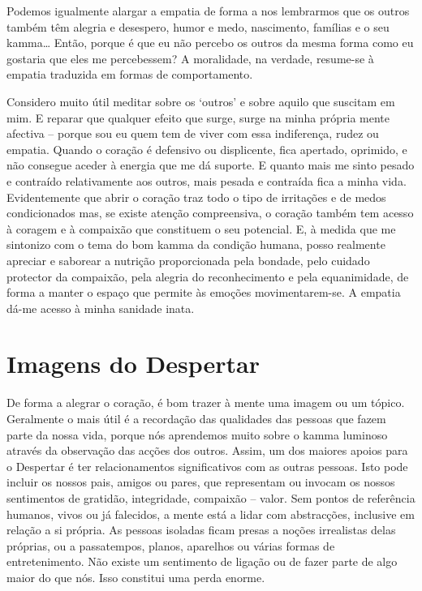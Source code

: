 Podemos igualmente alargar a empatia de forma a nos lembrarmos que os outros também têm alegria e desespero, humor e medo, nascimento, famílias e o seu kamma\ldots{} Então, porque é que eu não percebo os outros da mesma forma como eu gostaria que eles me percebessem? A moralidade, na verdade, resume-se à empatia traduzida em formas de comportamento.

Considero muito útil meditar sobre os `outros' e sobre aquilo que suscitam em mim. E reparar que qualquer efeito que surge, surge na minha própria mente afectiva -- porque sou eu quem tem de viver com essa indiferença, rudez ou empatia. Quando o coração é defensivo ou displicente, fica apertado, oprimido, e não consegue aceder à energia que me dá suporte. E quanto mais me sinto pesado e contraído relativamente aos outros, mais pesada e contraída fica a minha vida. Evidentemente que abrir o coração traz todo o tipo de irritações e de medos condicionados mas, se existe atenção compreensiva, o coração também tem acesso à coragem e à compaixão que constituem o seu potencial. E, à medida que me sintonizo com o tema do bom kamma da condição humana, posso realmente apreciar e saborear a nutrição proporcionada pela bondade, pelo cuidado protector da compaixão, pela alegria do reconhecimento e pela equanimidade, de forma a manter o espaço que permite às emoções movimentarem-se. A empatia dá-me acesso à minha sanidade inata.

\section{Imagens do Despertar}

De forma a alegrar o coração, é bom trazer à mente uma imagem ou um tópico. Geralmente o mais útil é a recordação das qualidades das pessoas que fazem parte da nossa vida, porque nós aprendemos muito sobre o kamma luminoso através da observação das acções dos outros. Assim, um dos maiores apoios para o Despertar é ter relacionamentos significativos com as outras pessoas. Isto pode incluir os nossos pais, amigos ou pares, que representam ou invocam os nossos sentimentos de gratidão, integridade, compaixão -- valor. Sem pontos de referência humanos, vivos ou já falecidos, a mente está a lidar com abstracções, inclusive em relação a si própria. As pessoas isoladas ficam presas a noções irrealistas delas próprias, ou a passatempos, planos, aparelhos ou várias formas de entretenimento. Não existe um sentimento de ligação ou de fazer parte de algo maior do que nós. Isso constitui uma perda enorme.

